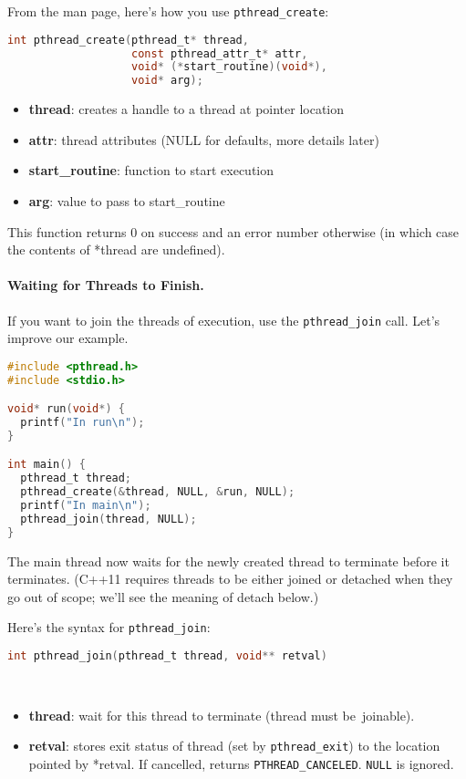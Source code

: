 From the man page, here's how you use \verb+pthread_create+:
\begin{lstlisting}[language=C]
int pthread_create(pthread_t* thread, 
                   const pthread_attr_t* attr,
                   void* (*start_routine)(void*),
                   void* arg);
\end{lstlisting}

\begin{itemize}
\item  {\bf thread}: creates a handle to a thread at pointer location

\item  {\bf attr}: thread attributes (NULL for defaults, more details later)

\item  {\bf start\_routine}: function to start execution

\item   {\bf arg}: value to pass to start\_routine
\end{itemize}

This function returns 0 on success and an error number otherwise (in
which case the contents of *thread are undefined).

\paragraph{Waiting for Threads to Finish.} If you want to join the threads
of execution, use the {\tt pthread\_join} call. Let's improve our example.

\begin{lstlisting}[language=C]
#include <pthread.h>
#include <stdio.h>

void* run(void*) {
  printf("In run\n");
}

int main() {
  pthread_t thread;
  pthread_create(&thread, NULL, &run, NULL);
  printf("In main\n");
  pthread_join(thread, NULL);
}
\end{lstlisting}

The main thread now waits for the newly created thread to terminate
before it terminates. (C++11 requires threads to be either joined or
detached when they go out of scope; we'll see the meaning of detach below.)

Here's the syntax for {\tt pthread\_join}:

\begin{lstlisting}[language=C]
int pthread_join(pthread_t thread, void** retval)
\end{lstlisting}
~\vspace*{-3em}
\begin{itemize}
\item  {\bf thread}: wait for this thread to terminate (thread must be~joinable).

\item  {\bf retval}: stores exit status of thread (set by {\tt pthread\_exit}) to
                 the location pointed by *retval. If cancelled, returns
                 {\tt PTHREAD\_CANCELED}. {\tt NULL} is ignored.
\end{itemize}

